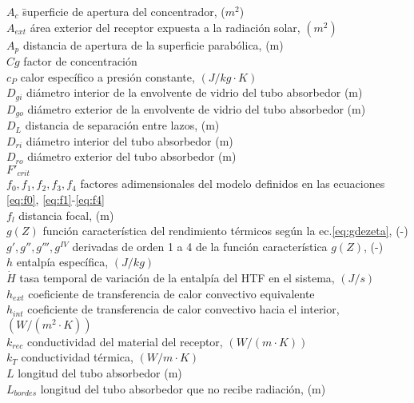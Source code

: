 \begin{tabbing}
$A_{c}$ \quad\quad\quad\quad\quad\quad\= superficie de apertura del concentrador, ($m^2$) \\
$A_{ext}$ \>  área exterior del receptor expuesta a la radiación solar, $(m^2)$ \\
$A_{p}$ \> distancia de apertura de la superficie parabólica, (m) \\
$Cg$  \>   factor de concentración \\
$c_P$ \> calor específico a presión constante, $(J/kg\cdot K)$ \\
$D_{gi}$  \>  diámetro interior de la envolvente de vidrio del tubo absorbedor (m) \\
$D_{go}$ \> diámetro exterior de la envolvente de vidrio del tubo absorbedor (m)   \\
$D_L$ \> distancia de separación entre lazos, (m) \\
$D_{ri}$  \>  diámetro interior del tubo absorbedor (m) \\
$D_{ro}$ \> diámetro exterior del tubo absorbedor (m)   \\
$F'_{crit}$ \> \\
$f_0, f_1, f_2, f_3, f_4$ \> factores adimensionales del modelo definidos en las ecuaciones \eqref{eq:f0}, \eqref{eq:f1}-\eqref{eq:f4} \\
$f_l$ \> distancia focal, (m) \\
$g(Z)$ \> función característica del rendimiento térmicos según la ec.\eqref{eq:gdezeta}, (-) \\
$g', g'', g''', g^{IV}$ \> derivadas de orden 1 a 4 de la función característica $g(Z)$, (-) \\
$h$ \> entalpía específica, $(J/kg)$ \\
$\dot H$ \> tasa temporal de variación de la entalpía del HTF en el sistema, $(J/s)$ \\
$h_{ext}$ \> coeficiente de transferencia de calor convectivo equivalente \\
$h_{int}$ \> coeficiente de transferencia de calor convectivo hacia el interior, $(W/(m^{2}\cdot K))$ \\
$k_{rec}$ \> conductividad del material del receptor, $(W/(m\cdot K))$ \\
$k_T$ \> conductividad térmica, $(W/m \cdot K)$ \\
$L$  \> longitud del tubo absorbedor (m) \\
$L_{bordes}$  \> longitud del tubo absorbedor que no recibe radiación, (m) \\

\end{tabbing}
